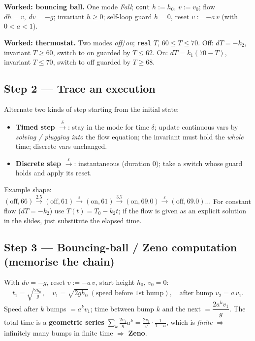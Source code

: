 \textbf{Worked: bouncing ball.} One mode \emph{Fall}; \texttt{cont} $h:=h_0,\,v:=v_0$;
flow $dh=v,\ dv=-g$; invariant $h\ge 0$; self-loop guard $h=0$, reset $v:=-a\,v$ (with $0<a<1$).

\textbf{Worked: thermostat.} Two modes \emph{off}/\emph{on}; \texttt{real} $T$, $60\le T\le 70$.
Off: $dT=-k_2$, invariant $T\ge 60$, switch to on guarded by $T\le 62$.
On: $dT=k_1(70-T)$, invariant $T\le 70$, switch to off guarded by $T\ge 68$.

\subsection*{Step 2 --- Trace an execution}
Alternate two kinds of step starting from the initial state:
\begin{itemize}
  \item \textbf{Timed step} $\xrightarrow{\;\delta\;}$: stay in the mode for time $\delta$;
        update continuous vars by \emph{solving / plugging into} the flow equation; the invariant
        must hold the \emph{whole} time; discrete vars unchanged.
  \item \textbf{Discrete step} $\xrightarrow{\varepsilon}$: instantaneous (duration $0$); take a
        switch whose guard holds and apply its reset.
\end{itemize}
Example shape: $(\text{off},66)\xrightarrow{2.5}(\text{off},61)\xrightarrow{\varepsilon}
(\text{on},61)\xrightarrow{3.7}(\text{on},69.0)\xrightarrow{\varepsilon}(\text{off},69.0)\dots$
For constant flow ($dT=-k_2$) use $T(t)=T_0-k_2 t$; if the flow is given as an explicit solution in
the slides, just substitute the elapsed time.

\subsection*{Step 3 --- Bouncing-ball / Zeno computation (memorise the chain)}
With $dv=-g$, reset $v:=-a\,v$, start height $h_0$, $v_0=0$:
\[
t_1=\sqrt{\tfrac{2h_0}{g}},\quad
v_1=\sqrt{2gh_0}\ (\text{speed before 1st bump}),\quad
\text{after bump } v_2=a\,v_1 .
\]
Speed after $k$ bumps $=a^k v_1$; time between bump $k$ and the next $=\dfrac{2a^k v_1}{g}$.
The total time is a \textbf{geometric series} $\sum_k \tfrac{2v_1}{g}a^k = \tfrac{2v_1}{g}\cdot
\tfrac{1}{1-a}$, which is \emph{finite} $\Rightarrow$ infinitely many bumps in finite time
$\Rightarrow$ \textbf{Zeno}.

